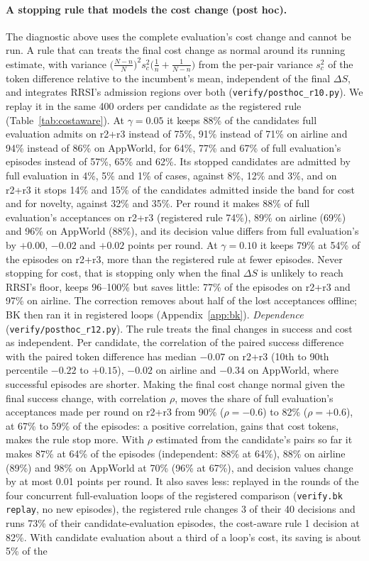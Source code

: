 \documentclass[11pt]{article}
\begin{document}
\paragraph{A stopping rule that models the cost change (post hoc).} The diagnostic above uses the complete evaluation's cost change and cannot be run. A rule that can treats the final cost change as normal around its running estimate, with variance $\big(\frac{N-n}{N}\big)^2 s_c^2\big(\frac1n+\frac1{N-n}\big)$ from the per-pair variance $s_c^2$ of the token difference relative to the incumbent's mean, independent of the final $\Delta S$, and integrates RRSI's admission regions over both (\texttt{verify/posthoc\_r10.py}). We replay it in the same 400 orders per candidate as the registered rule (Table~\ref{tab:costaware}). At $\gamma=0.05$ it keeps 88\% of the candidates full evaluation admits on r2+r3 instead of 75\%, 91\% instead of 71\% on airline and 94\% instead of 86\% on AppWorld, for 64\%, 77\% and 67\% of full evaluation's episodes instead of 57\%, 65\% and 62\%. Its stopped candidates are admitted by full evaluation in 4\%, 5\% and 1\% of cases, against 8\%, 12\% and 3\%, and on r2+r3 it stops 14\% and 15\% of the candidates admitted inside the band for cost and for novelty, against 32\% and 35\%. Per round it makes 88\% of full evaluation's acceptances on r2+r3 (registered rule 74\%), 89\% on airline (69\%) and 96\% on AppWorld (88\%), and its decision value differs from full evaluation's by $+0.00$, $-0.02$ and $+0.02$ points per round. At $\gamma=0.10$ it keeps 79\% at 54\% of the episodes on r2+r3, more than the registered rule at fewer episodes. Never stopping for cost, that is stopping only when the final $\Delta S$ is unlikely to reach RRSI's floor, keeps 96--100\% but saves little: 77\% of the episodes on r2+r3 and 97\% on airline. The correction removes about half of the lost acceptances offline; BK then ran it in registered loops (Appendix~\ref{app:bk}). \emph{Dependence} (\texttt{verify/posthoc\_r12.py}). The rule treats the final changes in success and cost as independent. Per candidate, the correlation of the paired success difference with the paired token difference has median $-0.07$ on r2+r3 (10th to 90th percentile $-0.22$ to $+0.15$), $-0.02$ on airline and $-0.34$ on AppWorld, where successful episodes are shorter. Making the final cost change normal given the final success change, with correlation $\rho$, moves the share of full evaluation's acceptances made per round on r2+r3 from 90\% ($\rho=-0.6$) to 82\% ($\rho=+0.6$), at 67\% to 59\% of the episodes: a positive correlation, gains that cost tokens, makes the rule stop more. With $\rho$ estimated from the candidate's pairs so far it makes 87\% at 64\% of the episodes (independent: 88\% at 64\%), 88\% on airline (89\%) and 98\% on AppWorld at 70\% (96\% at 67\%), and decision values change by at most 0.01 points per round. It also saves less: replayed in the rounds of the four concurrent full-evaluation loops of the registered comparison (\texttt{verify.bk replay}, no new episodes), the registered rule changes 3 of their 40 decisions and runs 73\% of their candidate-evaluation episodes, the cost-aware rule 1 decision at 82\%. With candidate evaluation about a third of a loop's cost, its saving is about 5\% of the 
\end{document}
